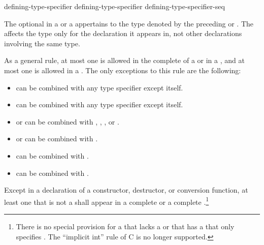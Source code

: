 \begin{bnf}
\br
  defining-type-specifier \br
  defining-type-specifier defining-type-specifier-seq
\end{bnf}

The optional  in a 
or a 
appertains
to the type denoted by the preceding 
or . The
 affects the type only for the declaration it appears in,
not other declarations involving the same type.

\pnum
As a general rule, at most one
is allowed in the complete
 of a  or in a
,
and at most one
is allowed in a
.
The only exceptions to this rule are the following:
\begin{itemize}
\item {} can be combined with any type specifier except itself.

\item {} can be combined with any type specifier except itself.

\item {} or  can be combined with
, , , or .

\item {} or  can be combined with .

\item {} can be combined with .

\item {} can be combined with .
\end{itemize}

\pnum
Except in a declaration of a constructor, destructor, or conversion
function, at least one  that is not a
 shall appear in a complete
 or a complete
.\footnote{There is no special
provision for a  that
lacks a  or that has a
 that only specifies .
The ``implicit int'' rule of C is no longer supported.}


